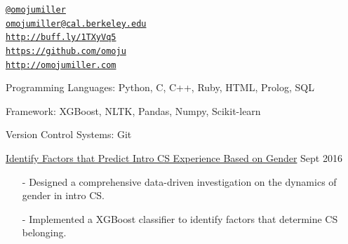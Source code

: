 \documentclass[10.5pt,article,oneside]{memoir}
\makeatletter
\def\myemail{omojumiller@cal.berkeley.edu}
\def\myweb{http://omojumiller.com}
\def\mytwitter{@omojumiller}
\def\mylinkedin{http://buff.ly/1TXyVq5}
\def\mygithub{https://github.com/omoju}
\makeatother
\begin{document}
\begin{minipage}[t]{2.95in}
  
\end{minipage}
\hfill     
\hfill
\begin{minipage}[t]{1.6in}
  \flushright \footnotesize  \addressblock 
  {\scriptsize  \texttt{\href{http://twitter.com/omojumiller}{\mytwitter}} \, \faTwitter }  \\ 
  {\scriptsize  \texttt{\href{mailto:\myemail}{\myemail}} \, \faEnvelope} \\
  {\scriptsize  \texttt{\href{\mylinkedin}{\mylinkedin}} \, \faLinkedin} \\
  {\scriptsize  \texttt{\href{\mygithub}{\mygithub}} \, \faGithub} \\
  {\scriptsize  \texttt{\href{\myweb}{\myweb}} \, \faGlobe}
\end{minipage}

\medskip


\bigskip       
{}
\reversemarginpar

\medskip

\ind Programming Languages: Python, C, C++, Ruby, HTML, Prolog, SQL

\ind Framework: XGBoost, NLTK, Pandas, Numpy, Scikit-learn

\ind Version Control Systems: Git
\bigskip 

\medskip

\ind \href{https://github.com/omoju/genderCSExperience}{Identify Factors that Predict Intro CS Experience Based on Gender} \hfill Sept 2016 
\begin{itemize}[noitemsep,nolistsep]
\item[-] Designed a comprehensive data-driven investigation on the dynamics of gender in intro CS. 
\item[-] Implemented a XGBoost classifier to identify factors that determine CS belonging.
\end{itemize}
\end{document}
